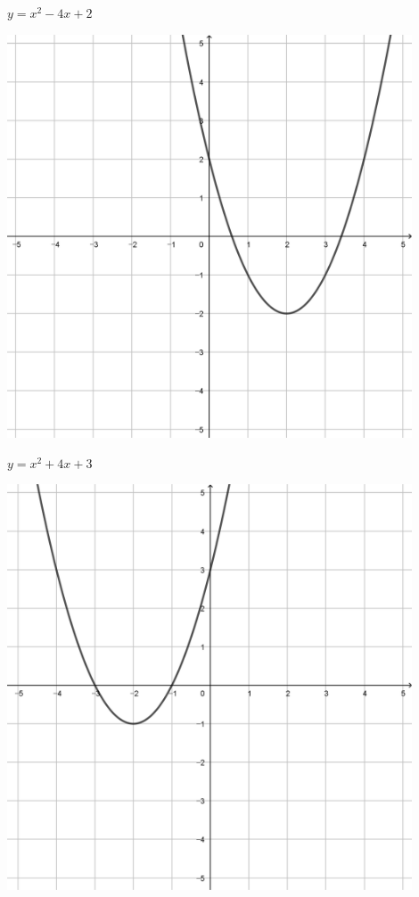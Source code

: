 \documentclass[a4paper]{oblivoir}
\begin{document}
\begin{minipage}{0.45\textwidth}\centering
\(y=x^2-4x+2\)
\par\bigskip\includegraphics[width=0.9\textwidth]{img/10-3}
\end{minipage}
\begin{minipage}{0.45\textwidth}\centering
\(y=x^2+4x+3\)
\par\bigskip\includegraphics[width=0.9\textwidth]{img/10-4}
\end{minipage}\bigskip\bigskip\par
\end{document}
